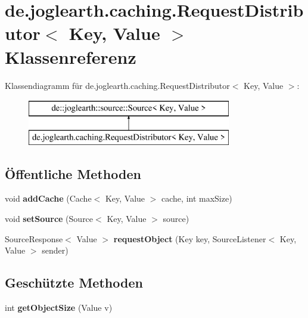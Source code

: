 \section{de.\-joglearth.\-caching.\-Request\-Distributor$<$ Key, Value $>$ Klassenreferenz}
\label{classde_1_1joglearth_1_1caching_1_1_request_distributor_3_01_key_00_01_value_01_4}
Klassendiagramm für de.\-joglearth.\-caching.\-Request\-Distributor$<$ Key, Value $>$\-:\begin{figure}[H]
\begin{center}
\leavevmode
\includegraphics[height=2.000000cm]{classde_1_1joglearth_1_1caching_1_1_request_distributor_3_01_key_00_01_value_01_4}
\end{center}
\end{figure}
\subsection*{Öffentliche Methoden}
\begin{DoxyCompactItemize}
\item 
void {\bfseries add\-Cache} (Cache$<$ Key, Value $>$ cache, int max\-Size)\label{classde_1_1joglearth_1_1caching_1_1_request_distributor_3_01_key_00_01_value_01_4_aff8116b1acc6c6f135854bfa87808084}

\item 
void {\bfseries set\-Source} (Source$<$ Key, Value $>$ source)\label{classde_1_1joglearth_1_1caching_1_1_request_distributor_3_01_key_00_01_value_01_4_afc199efae4eaedbd0f1395985a94015f}

\item 
Source\-Response$<$ Value $>$ {\bfseries request\-Object} (Key key, Source\-Listener$<$ Key, Value $>$ sender)\label{classde_1_1joglearth_1_1caching_1_1_request_distributor_3_01_key_00_01_value_01_4_a5e44b1f023f4dbf7f6540b7de3a4eb2e}

\end{DoxyCompactItemize}
\subsection*{Geschützte Methoden}
\begin{DoxyCompactItemize}
\item 
int {\bfseries get\-Object\-Size} (Value v)\label{classde_1_1joglearth_1_1caching_1_1_request_distributor_3_01_key_00_01_value_01_4_ab109db4b6e2acdfb22a75cf84401d490}

\end{DoxyCompactItemize}
